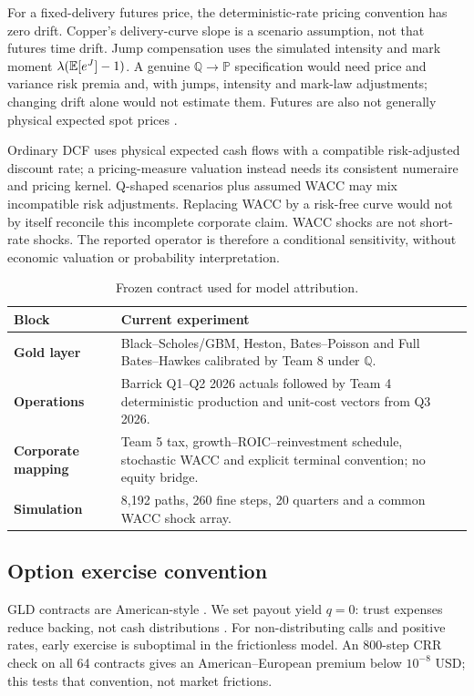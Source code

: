 For a fixed-delivery futures price, the deterministic-rate pricing convention has zero drift. Copper's delivery-curve slope is a scenario assumption, not that futures time drift. Jump compensation uses the simulated intensity and mark moment $\lambda(\mathbb{E}[e^J]-1)$. A genuine $\mathbb Q\rightarrow\mathbb P$ specification would need price and variance risk premia and, with jumps, intensity and mark-law adjustments; changing drift alone would not estimate them. Futures are also not generally physical expected spot prices \citep{schwartz1997}.

Ordinary DCF uses physical expected cash flows with a compatible risk-adjusted discount rate; a pricing-measure valuation instead needs its consistent numeraire and pricing kernel. Q-shaped scenarios plus assumed WACC may mix incompatible risk adjustments. Replacing WACC by a risk-free curve would not by itself reconcile this incomplete corporate claim. WACC shocks are not short-rate shocks. The reported operator is therefore a conditional sensitivity, without economic valuation or probability interpretation.

\begin{table}[H]
\centering
\caption{Frozen contract used for model attribution.}
\label{tab:frozen_contract}
\begin{tabularx}{\columnwidth}{@{}>{\bfseries}p{}X@{}}
\toprule
Block & Current experiment \\
\midrule
Gold layer & Black--Scholes/GBM, Heston, Bates--Poisson and Full Bates--Hawkes calibrated by Team 8 under $\mathbb Q$. \\
Operations & Barrick Q1--Q2 2026 actuals followed by Team 4 deterministic production and unit-cost vectors from Q3 2026. \\
Corporate mapping & Team 5 tax, growth--ROIC--reinvestment schedule, stochastic WACC and explicit terminal convention; no equity bridge. \\
Simulation & 8,192 paths, 260 fine steps, 20 quarters and a common WACC shock array. \\
\bottomrule
\end{tabularx}
\end{table}

\subsection{Option exercise convention}
GLD contracts are American-style \citep{cboe2026}. We set payout yield $q=0$: trust expenses reduce backing, not cash distributions \citep{spdr2025}. For non-distributing calls and positive rates, early exercise is suboptimal in the frictionless model. An 800-step CRR check on all 64 contracts gives an American--European premium below $10^{-8}$ USD; this tests that convention, not market frictions.

